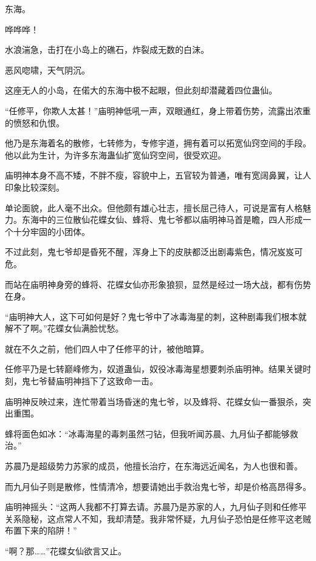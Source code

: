 
\begin{this_body}

东海。

哗哗哗！

水浪湍急，击打在小岛上的礁石，炸裂成无数的白沫。

恶风唿啸，天气阴沉。

这座无人的小岛，在偌大的东海中极不起眼，但此刻却潜藏着四位蛊仙。

“任修平，你欺人太甚！”庙明神低吼一声，双眼通红，身上带着伤势，流露出浓重的愤怒和仇恨。

他乃是东海着名的散修，七转修为，专修宇道，拥有着可以拓宽仙窍空间的手段。他以此为生计，为许多东海蛊仙扩宽仙窍空间，很受欢迎。

庙明神本身不高不矮，不胖不瘦，容貌中上，五官较为普通，唯有宽阔鼻翼，让人印象比较深刻。

单论面貌，此人毫不出众。但他颇有雄心壮志，擅长屈己待人，可说是富有人格魅力。东海中的三位散仙花蝶女仙、蜂将、鬼七爷都以庙明神马首是瞻，四人形成一个十分牢固的小团体。

不过此刻，鬼七爷却是昏死不醒，浑身上下的皮肤都泛出剧毒紫色，情况岌岌可危。

而站在庙明神身旁的蜂将、花蝶女仙亦形象狼狈，显然是经过一场大战，都有伤势在身。

“庙明神大人，这下可如何是好？鬼七爷中了冰毒海星的刺，这种剧毒我们根本就解不了啊。”花蝶女仙满脸忧愁。

就在不久之前，他们四人中了任修平的计，被他暗算。

任修平乃是七转巅峰修为，奴道蛊仙，奴役冰毒海星想要刺杀庙明神。结果关键时刻，鬼七爷替庙明神挡下了这致命一击。

庙明神反映过来，连忙带着当场昏迷的鬼七爷，以及蜂将、花蝶女仙一番狠杀，突出重围。

蜂将面色如冰：“冰毒海星的毒刺虽然刁钻，但我听闻苏晨、九月仙子都能够救治。”

苏晨乃是超级势力苏家的成员，他擅长治疗，在东海远近闻名，为人也很和善。

而九月仙子则是散修，性情清冷，想要请她出手救治鬼七爷，却是价格高昂得多。

庙明神摇头：“这两人我都不打算去请。苏晨乃是苏家的人，九月仙子则和任修平关系隐秘，这点常人不知，我却清楚。我非常怀疑，九月仙子恐怕是任修平这老贼布置下来的陷阱！”

“啊？那……”花蝶女仙欲言又止。


\end{this_body}
